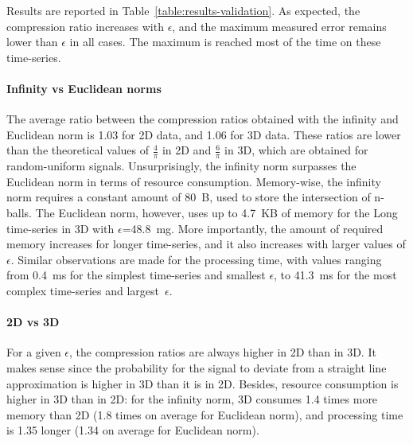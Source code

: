 \documentclass[10pt, conference, compsocconf]{IEEEtran}
\begin{document}
Results are reported in Table~\ref{table:results-validation}. 
As expected, the compression ratio increases with $\epsilon$, and the 
maximum measured error remains lower than $\epsilon$ in all cases. The 
maximum is reached most of the time on these time-series.

\paragraph{Infinity vs Euclidean norms}
The average ratio between the compression ratios obtained
with the infinity and Euclidean norm is 1.03 for 2D data, and 1.06
for 3D data. These ratios are lower than the theoretical values of
$\frac{4}{\pi}$ in 2D and $\frac{6}{\pi}$ in 3D, which are obtained for
random-uniform signals. Unsurprisingly, the infinity norm surpasses the
Euclidean norm in terms of resource consumption. Memory-wise, the
infinity norm requires a constant amount of 80~B, used to store the
intersection of n-balls. The Euclidean norm, however, uses up to 4.7~KB of memory
for the Long time-series in 3D with $\epsilon$=48.8~mg. More importantly,
the amount of required memory increases for longer time-series, and it also increases with larger
values of $\epsilon$. Similar observations are made for the processing
time, with values ranging from 0.4~ms for the simplest time-series and
smallest $\epsilon$, to 41.3~ms for the most complex time-series and
largest~$\epsilon$.

\paragraph{2D vs 3D}
For a given $\epsilon$, the compression
ratios are always higher in 2D than in 3D. It makes sense since the
probability for the signal to deviate from a straight line
approximation is higher in 3D than it is in 2D. Besides, resource
consumption is higher in 3D than in 2D: for the infinity norm, 3D
consumes 1.4 times more memory than 2D (1.8 times on average for
Euclidean norm), and processing time is 1.35 longer (1.34 on
average for Euclidean norm).
\end{document}
